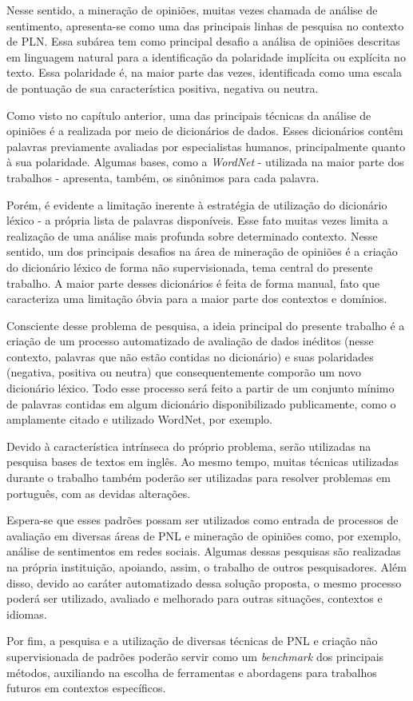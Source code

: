 \documentclass[a4paper,11pt]{article}
\begin{document}
Nesse sentido, a mineração de opiniões, muitas vezes chamada de análise de sentimento, apresenta-se como uma das principais linhas de pesquisa no contexto de PLN. Essa subárea tem como principal desafio a análisa de opiniões descritas em linguagem natural para a identificação da polaridade implícita ou explícita no texto. Essa polaridade é, na maior parte das vezes, identificada como uma escala de pontuação de sua característica positiva, negativa ou neutra.

Como visto no capítulo anterior, uma das principais técnicas da análise de opiniões é a realizada por meio de dicionários de dados. Esses dicionários contêm palavras previamente avaliadas por especialistas humanos, principalmente quanto à sua polaridade. Algumas bases, como a \emph{WordNet} - utilizada na maior parte dos trabalhos - apresenta, também, os sinônimos para cada palavra.

Porém, é evidente a limitação inerente à estratégia de utilização do dicionário léxico - a própria lista de palavras disponíveis. Esse fato muitas vezes limita a realização de uma análise mais profunda sobre determinado contexto. Nesse sentido, um dos principais desafios na área de mineração de opiniões é a criação do dicionário léxico de forma não supervisionada, tema central do presente trabalho. A maior parte desses dicionários é feita de forma manual, fato que caracteriza uma limitação óbvia para a maior parte dos contextos e domínios. 

Consciente desse problema de pesquisa, a ideia principal do presente trabalho é a criação de um processo automatizado de avaliação de dados inéditos (nesse contexto, palavras que não estão contidas no dicionário) e suas polaridades (negativa, positiva ou neutra) que consequentemente comporão um novo dicionário léxico. Todo esse processo será feito a partir de um conjunto mínimo de palavras contidas em algum dicionário disponibilizado publicamente, como o amplamente citado e utilizado WordNet, por exemplo.

Devido à característica intrínseca do próprio problema, serão utilizadas na pesquisa bases de textos em inglês. Ao mesmo tempo, muitas técnicas utilizadas durante o trabalho também poderão ser utilizadas para resolver problemas em português, com as devidas alterações. 

Espera-se que esses padrões possam ser utilizados como entrada de processos de avaliação em diversas áreas de PNL e mineração de opiniões como, por exemplo, análise de sentimentos em redes sociais. Algumas dessas pesquisas são realizadas na própria instituição, apoiando, assim, o trabalho de outros pesquisadores. Além disso, devido ao caráter automatizado dessa solução proposta, o mesmo processo poderá ser utilizado, avaliado e melhorado para outras situações, contextos e idiomas.

Por fim, a pesquisa e a utilização de diversas técnicas de PNL e criação não supervisionada de padrões poderão servir como um \emph{benchmark} dos principais métodos, auxiliando na escolha de ferramentas e abordagens para trabalhos futuros em contextos específicos.




\end{document}

